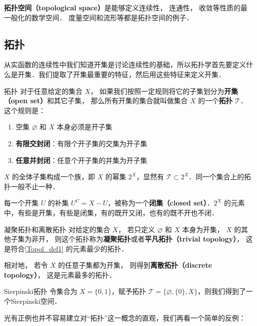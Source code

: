
\textbf{拓扑空间（topological space）}是能够定义连续性， 连通性， 收敛等性质的最一般化的数学空间． 度量空间和流形等都是拓扑空间的例子．

\subsection{拓扑}

从实函数的连续性中我们知道开集是讨论连续性的基础，所以拓扑学首先要定义什么是开集．我们提取了开集最重要的特征，然后用这些特征来定义开集．

\begin{definition}{拓扑}\label{Topol_def1}
对于任意给定的集合 $X$， 如果我们按照一定规则将它的子集划分为\textbf{开集（open set）}和其它子集， 那么所有开集的集合就叫做集合 $X$ 的一个\textbf{拓扑} $\mathcal{T}$． 这个规则是：
\begin{enumerate}
\item 空集 $\varnothing$ 和 $X$ 本身必须是开子集
\item \textbf{有限交封闭}：有限个开子集的交集为开子集
\item \textbf{任意并封闭}：任意个开子集的并集为开子集
\end{enumerate}
\end{definition}

$X$ 的全体子集构成一个族，即 $X$ 的幂集 $2^X$，显然有 $\mathcal{T}\subset2^X$．同一个集合上的拓扑一般不止一种．

每一个开集 $U$ 的补集 $U^C=X-U$，被称为一个\textbf{闭集（closed set）}．$2^X$ 的元素中，有些是开集，有些是闭集，有的既开又闭，也有的既不开也不闭．

\begin{example}{凝聚拓扑和离散拓扑}
对给定的集合 $X$， 若只定义 $\varnothing$ 和 $X$ 本身为开集， $X$ 的其他子集为非开， 则这个拓扑称为\textbf{凝聚拓扑}或者\textbf{平凡拓扑（trivial topology）}， 这是符合\autoref{Topol_def1} 的元素最少的拓扑．

相对地， 若令 $X$ 的任意子集都为开集， 则得到\textbf{离散拓扑（discrete topology）}， 这是元素最多的拓扑．
\end{example}

\begin{example}{Sierpinski拓扑}
令集合为 $X=\{0, 1\}$，赋予拓扑 $\mathcal{T}=\{\varnothing, \{0\}, X\}$，则我们得到了一个Sierpinski空间．
\end{example}

光有正例也并不容易建立对“拓扑”这一概念的直观，我们再看一个简单的反例：

